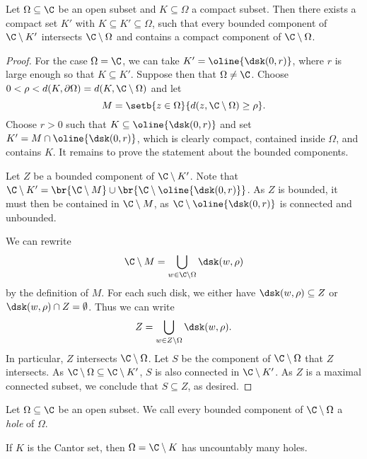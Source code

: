 \begin{lema}
Let $\Omega \subseteq \C$ be an open subset and
$K \subseteq \Omega$ a compact subset. Then there exists a compact
set $K'$ with $K \subseteq K' \subseteq \Omega$, such that every
bounded component of $\C \setminus K'$ intersects
$\C \setminus \Omega$ and contains a compact component of
$\C \setminus \Omega$.
\end{lema}

\begin{proof}
For the case $\Omega = \C$, we can take $K' = \oline{\dsk(0,r)}$,
where $r$ is large enough so that $K \subseteq K'$. Suppose then
that $\Omega \ne \C$. Choose
$0 < \rho < d(K, \partial \Omega) = d(K, \C \setminus \Omega)$ and
let
\[
M = \setb{z \in \Omega}{d(z, \C \setminus \Omega) \geq \rho}.
\]
Choose $r > 0$ such that $K \subseteq \oline{\dsk(0,r)}$ and set
$K' = M \cap \oline{\dsk(0,r)}$, which is clearly compact,
contained inside $\Omega$, and contains $K$. It remains to prove
the statement about the bounded components.

Let $Z$ be a bounded component of $\C \setminus K'$. Note that
$\C \setminus K' =
\br{\C \setminus M} \cup \br{\C \setminus \oline{\dsk(0,r)}}$. As
$Z$ is bounded, it must then be contained in $\C \setminus M$, as
$\C \setminus \oline{\dsk(0,r)}$ is connected and unbounded.

We can rewrite
\[
\C \setminus M = \bigcup_{w \in \C \setminus \Omega} \dsk(w, \rho)
\]
by the definition of $M$. For each such disk, we either have
$\dsk(w, \rho) \subseteq Z$ or $\dsk(w, \rho) \cap Z = \emptyset$.
Thus we can write
\[
Z = \bigcup_{w \in Z \setminus \Omega} \dsk(w, \rho).
\]
In particular, $Z$ intersects $\C \setminus \Omega$. Let $S$ be the
component of $\C \setminus \Omega$ that $Z$ intersects. As
$\C \setminus \Omega \subseteq \C \setminus K'$, $S$ is also
connected in $\C \setminus K'$. As $Z$ is a maximal connected
subset, we conclude that $S \subseteq Z$, as desired.
\end{proof}

\begin{definicija}
Let $\Omega \subseteq \C$ be an open subset. We call every bounded
component of $\C \setminus \Omega$ a \emph{hole} of
$\Omega$.
\end{definicija}

\begin{opomba}
If $K$ is the Cantor set, then $\Omega = \C \setminus K$ has
uncountably many holes.
\end{opomba}

